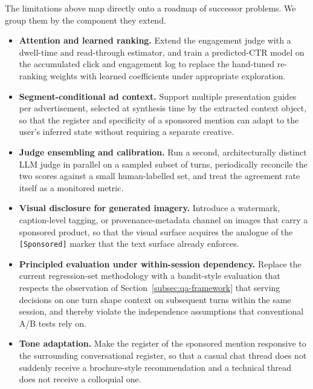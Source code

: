 The limitations above map directly onto a roadmap of successor
problems. We group them by the component they extend.

\begin{itemize}[leftmargin=1.8em]
  \item \textbf{Attention and learned ranking.} Extend the engagement
    judge with a dwell-time and read-through estimator, and train a
    predicted-CTR model on the accumulated click and engagement log to
    replace the hand-tuned re-ranking weights with learned
    coefficients under appropriate exploration.

  \item \textbf{Segment-conditional ad context.} Support multiple
    presentation guides per advertisement, selected at synthesis time
    by the extracted context object, so that the register and
    specificity of a sponsored mention can adapt to the user's
    inferred state without requiring a separate creative.

  \item \textbf{Judge ensembling and calibration.} Run a second,
    architecturally distinct LLM judge in parallel on a sampled
    subset of turns, periodically reconcile the two scores against a
    small human-labelled set, and treat the agreement rate itself as
    a monitored metric.

  \item \textbf{Visual disclosure for generated imagery.} Introduce a
    watermark, caption-level tagging, or provenance-metadata channel
    on images that carry a sponsored product, so that the visual
    surface acquires the analogue of the \texttt{[Sponsored]} marker
    that the text surface already enforces.

  \item \textbf{Principled evaluation under within-session
    dependency.} Replace the current regression-set methodology with
    a bandit-style evaluation that respects the observation of
    Section~\ref{subsec:qa-framework} that serving decisions on one
    turn shape context on subsequent turns within the same session,
    and thereby violate the independence assumptions that
    conventional A/B tests rely on.

  \item \textbf{Tone adaptation.} Make the register of the sponsored
    mention responsive to the surrounding conversational register, so
    that a casual chat thread does not suddenly receive a
    brochure-style recommendation and a technical thread does not
    receive a colloquial one.


\end{itemize}

